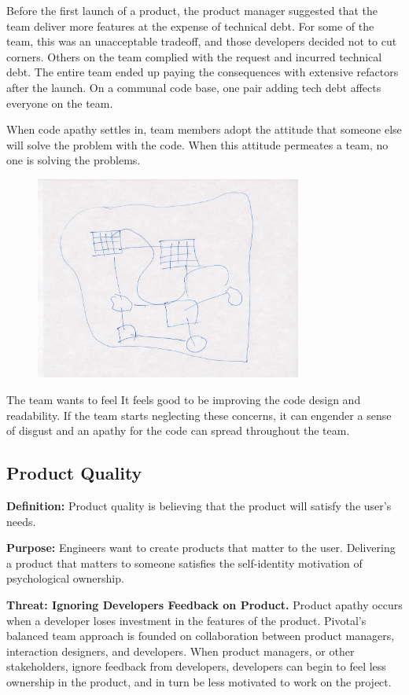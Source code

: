Before the first launch of a product, the product manager suggested that the team deliver more features at the expense of technical debt. For some of the team, this was an unacceptable tradeoff, and those developers decided not to cut corners. Others on the team complied with the request and incurred technical debt. The entire team ended up paying the consequences with extensive refactors after the launch. On a communal code base, one pair adding tech debt affects everyone on the team.

When code apathy settles in, team members adopt the attitude that someone else will solve the problem with the code. When this attitude permeates a team, no one is solving the problems. 

\begin{figure}[t]
\centering
\includegraphics[width=3.45in]{team_code_ownership_images/CodeOwnership.jpg}
\caption{}
\label{Programmer1}
\end{figure}

The team wants to feel   It feels good to be improving the code design and readability. If the team starts neglecting these concerns, it can engender a sense of disgust and an apathy for the code can spread throughout the team.

\subsection{Product Quality}
\textbf{Definition:} Product quality is believing that the product will satisfy the user's needs.

\textbf{Purpose:} Engineers want to create products that matter to the user. Delivering a product that matters to someone satisfies the self-identity motivation of psychological ownership.

\textbf{Threat: Ignoring Developers Feedback on Product.} Product apathy occurs when a developer loses investment in the features of the product. Pivotal's balanced team approach is founded on collaboration between product managers, interaction designers, and developers. When product managers, or other stakeholders, ignore feedback from developers, developers can begin to feel less ownership in the product, and in turn be less motivated to work on the project. 

